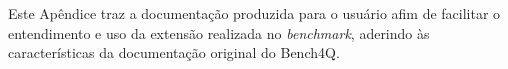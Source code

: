 Este Apêndice traz a documentação produzida para o usuário afim de facilitar o entendimento e uso da extensão realizada no \textit{benchmark}, aderindo às características da documentação original do Bench4Q.


